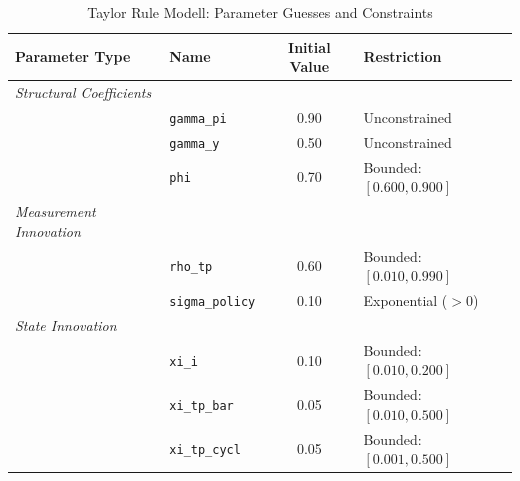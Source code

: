 \begin{table}[htbp]
\centering
\caption{Taylor Rule Modell: Parameter Guesses and Constraints}
\label{tab:taylor_rule_model_ssm_specs}
\begin{tabular}{llcl}
\hline\hline
\textbf{Parameter Type} & \textbf{Name} & \textbf{Initial Value} & \textbf{Restriction} \\ \hline
\textit{Structural Coefficients} &&& \\
    & \texttt{gamma\_pi} & 0.90 & Unconstrained \\
    & \texttt{gamma\_y} & 0.50 & Unconstrained \\
    & \texttt{phi} & 0.70 & Bounded: $[0.600, 0.900]$ \\
\hline
\textit{Measurement Innovation} &&& \\
    & \texttt{rho\_tp} & 0.60 & Bounded: $[0.010, 0.990]$ \\
    & \texttt{sigma\_policy} & 0.10 & Exponential ($>0$) \\
\hline
\textit{State Innovation} &&& \\
    & \texttt{xi\_i} & 0.10 & Bounded: $[0.010, 0.200]$ \\
    & \texttt{xi\_tp\_bar} & 0.05 & Bounded: $[0.010, 0.500]$ \\
    & \texttt{xi\_tp\_cycl} & 0.05 & Bounded: $[0.001, 0.500]$ \\
\hline\hline
\end{tabular}
\end{table}
